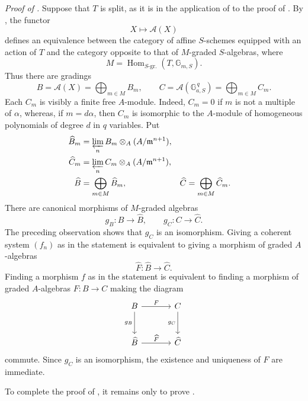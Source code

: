 \medskip
\noindent\emph{Proof of .}
Suppose that \(T\) is split, as it is in the application of  to
the proof of . By , the functor
\[
  X\longmapsto\mathscr A(X)
\]
defines an equivalence between the category of affine \(S\)-schemes
equipped with an action of \(T\) and the category opposite to that
of \(M\)-graded \(S\)-algebras, where
\[
  M=\operatorname{Hom}_{S\text{-gr.}}(T,\mathbb G_{m,S}).
\]
Thus there are gradings
\[
  B=\mathscr A(X)=\bigoplus_{m\in M}B_m,
  \qquad
  C=\mathscr A(\mathbb G_{a,S}^{\,q})
    =\bigoplus_{m\in M}C_m.
\]
Each \(C_m\) is visibly a finite free \(A\)-module. Indeed,
\(C_m=0\) if \(m\) is not a multiple of \(\alpha\), whereas, if
\(m=d\alpha\), then \(C_m\) is isomorphic to the \(A\)-module of
homogeneous polynomials of degree \(d\) in \(q\) variables. Put
\[
\begin{aligned}
  \widehat B_m
    &=\varprojlim_n B_m\otimes_A(A/\mathfrak m^{n+1}),\\
  \widehat C_m
    &=\varprojlim_n C_m\otimes_A(A/\mathfrak m^{n+1}),\\
  \widehat B&=\bigoplus_{m\in M}\widehat B_m,
  &\widehat C&=\bigoplus_{m\in M}\widehat C_m.
\end{aligned}
\]
There are canonical morphisms of \(M\)-graded algebras
\[
  g_B\colon B\longrightarrow\widehat B,
  \qquad
  g_C\colon C\longrightarrow\widehat C.
\]
The preceding observation shows that \(g_C\) is an isomorphism.
Giving a coherent system \((f_n)\) as in the statement is
equivalent to giving a morphism of graded \(A\)-algebras
\[
  \widehat F\colon\widehat B\longrightarrow\widehat C.
\]
Finding a morphism \(f\) as in the statement is equivalent to
finding a morphism of graded \(A\)-algebras \(F\colon B\to C\)
making the diagram
\[
\begin{tikzcd}[column sep=large,row sep=large]
B \arrow[r,"F"] \arrow[d,"g_B"']
  & C \arrow[d,"g_C"']\\
\widehat B \arrow[r,"\widehat F"]
  & \widehat C
\end{tikzcd}
\]
commute. Since \(g_C\) is an isomorphism, the existence and
uniqueness of \(F\) are immediate.

To complete the proof of , it remains only to prove .
